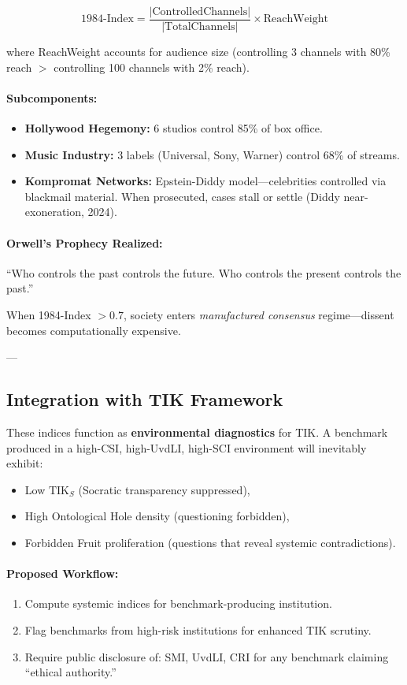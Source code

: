 \documentclass[11pt,a4paper]{article}
\theoremstyle{definition}
\theoremstyle{remark}
\begin{document}
\[
\text{1984-Index} = \frac{|\text{ControlledChannels}|}{|\text{TotalChannels}|} \times \text{ReachWeight}
\]

where ReachWeight accounts for audience size (controlling 3 channels with 80\% reach $>$ controlling 100 channels with 2\% reach).

\paragraph{Subcomponents:}
\begin{itemize}
\item \textbf{Hollywood Hegemony:} 6 studios control 85\% of box office.
\item \textbf{Music Industry:} 3 labels (Universal, Sony, Warner) control 68\% of streams.
\item \textbf{Kompromat Networks:} Epstein-Diddy model—celebrities controlled via blackmail material. When prosecuted, cases stall or settle (Diddy near-exoneration, 2024).
\end{itemize}

\paragraph{Orwell's Prophecy Realized:}
``Who controls the past controls the future. Who controls the present controls the past.''

When 1984-Index $> 0.7$, society enters \textit{manufactured consensus} regime—dissent becomes computationally expensive.

---

\subsection{Integration with TIK Framework}

These indices function as \textbf{environmental diagnostics} for TIK. A benchmark produced in a high-CSI, high-UvdLI, high-SCI environment will inevitably exhibit:
\begin{itemize}
\item Low $\text{TIK}_S$ (Socratic transparency suppressed),
\item High Ontological Hole density (questioning forbidden),
\item Forbidden Fruit proliferation (questions that reveal systemic contradictions).
\end{itemize}

\paragraph{Proposed Workflow:}
\begin{enumerate}
\item Compute systemic indices for benchmark-producing institution.
\item Flag benchmarks from high-risk institutions for enhanced TIK scrutiny.
\item Require public disclosure of: SMI, UvdLI, CRI for any benchmark claiming ``ethical authority.''
\end{enumerate}
\end{document}
